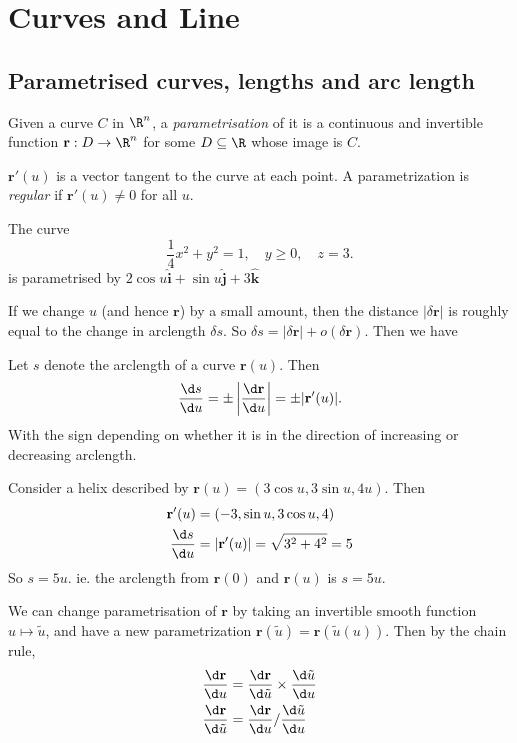 \documentclass[a4paper]{article}
\begin{document}
\section{Curves and Line}
\subsection{Parametrised curves, lengths and arc length}
\begin{defi}
  Given a curve $C$ in $\R^n$, a \emph{parametrisation} of it is a continuous and invertible function $\mathbf{r}: D\to \R^n$ for some $D\subseteq \R$ whose image is $C$.

  $\mathbf{r}'(u)$ is a vector tangent to the curve at each point. A parametrization is \emph{regular} if $\mathbf{r}'(u) \not= 0$ for all $u$.
\end{defi}

\begin{eg}
  The curve
  \[
    \frac{1}{4}x^2 + y^2 = 1, \quad y \geq 0, \quad z = 3.
  \]
  is parametrised by $2\cos u\hat{\mathbf{i}} + \sin u\hat{\mathbf{j}} + 3\hat{\mathbf{k}}$
\end{eg}

If we change $u$ (and hence $\mathbf{r}$) by a small amount, then the distance $|\delta \mathbf{r}|$ is roughly equal to the change in arclength $\delta s$. So $\delta s = |\delta \mathbf{r}| + o(\delta \mathbf{r})$. Then we have
\begin{prop}
  Let $s$ denote the arclength of a curve $\mathbf{r}(u)$. Then
  \[
    \frac{\d s}{\d u} = \pm \left|\frac{\d \mathbf{r}}{\d u}\right| = \pm |\mathbf{r}'(u)|.
  \]
  With the sign depending on whether it is in the direction of increasing or decreasing arclength. 
\end{prop}

\begin{eg}
  Consider a helix described by $\mathbf{r}(u) = (3\cos u, 3\sin u, 4u)$. Then
  \begin{align*}
    \mathbf{r}'(u) &= (-3,\sin u, 3\cos u, 4)\\
    \frac{\d s}{\d u} &= |\mathbf{r}'(u)| = \sqrt{3^2 + 4^2} = 5
  \end{align*}
  So $s = 5u$. ie. the arclength from $\mathbf{r}(0)$ and $\mathbf{r}(u)$ is $s = 5u$.
\end{eg}

We can change parametrisation of $\mathbf{r}$ by taking an invertible smooth function $u\mapsto \tilde{u}$, and have a new parametrization $\mathbf{r}(\tilde{u}) = \mathbf{r}(\tilde{u}(u))$. Then by the chain rule,
\begin{align*}
  \frac{\d \mathbf{r}}{\d u} &= \frac{\d \mathbf{r}}{\d \tilde{u}}\times \frac{\d \tilde{u}}{\d u}\\
  \frac{\d \mathbf{r}}{\d \tilde{u}} &= \frac{\d \mathbf{r}}{\d u}/ \frac{\d \tilde{u}}{\d u}
\end{align*}
\end{document}
